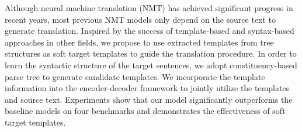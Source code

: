 Although neural machine translation (NMT) has achieved significant progress in recent years, most previous NMT models only depend on the source text to generate translation. Inspired by the success of template-based and syntax-based approaches in other fields, we propose to use extracted templates from tree structures as soft target templates to guide the translation procedure. In order to learn the syntactic structure of the target sentences, we adopt constituency-based parse tree to generate candidate templates. We incorporate the template information into the encoder-decoder framework to jointly utilize the templates and source text. Experiments show that our model significantly outperforms the baseline models on four benchmarks and demonstrates the effectiveness of soft target templates.
